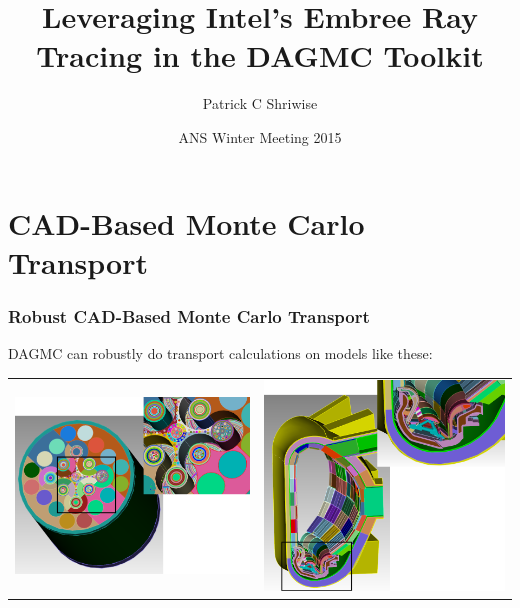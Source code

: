 \documentclass[12pt]{beamer}
\title{Leveraging Intel's Embree Ray Tracing in the DAGMC Toolkit}
\author{Patrick C Shriwise}
\institute{University of Wisconsin - Madison}
\date{ANS Winter Meeting 2015}
\begin{document}
\frame{\titlepage \addtocounter{framenumber}{-1}}


\begin{frame}
\frametitle{\null}
\tableofcontents
\end{frame}

\section{CAD-Based Monte Carlo Transport} %

\begin{frame}

\frametitle{Robust CAD-Based Monte Carlo Transport}

DAGMC can robustly do transport calculations on models like these:


\begin{center}
\begin{tabular}{c c}

\includegraphics[height=0.4\textheight]{./images/atr_both.png} &


\includegraphics[height=0.4\textheight]{./images/bllite_both.png} \\


\end{tabular}
\end{center}
\end{frame}
\end{document}
